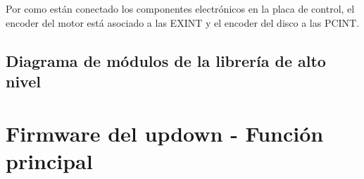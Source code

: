 Por como están conectado los componentes electrónicos en la placa de control, el encoder del motor está asociado a las EXINT y el encoder del disco a las PCINT.

\subsection{Diagrama de módulos de la librería de alto nivel}

\section{Firmware del updown - Función principal} \label{sec:\thesection}


